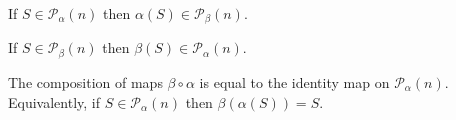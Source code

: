 \begin{lemma}
 If $S\in \mathcal{P}_\alpha(n)$ then $\alpha (S)\in \mathcal{P}_\beta(n)$.
\end{lemma}

\begin{lemma}
 If $S\in \mathcal{P}_\beta(n)$ then $\beta (S)\in \mathcal{P}_\alpha(n)$.
\end{lemma}

\begin{lemma}
  The composition of maps $\beta\circ\alpha$ is equal to the identity map on  $\mathcal{P}_\alpha(n)$. Equivalently, if $S\in \mathcal{P}_\alpha(n)$ then $\beta(\alpha(S))=S$.
\end{lemma}

